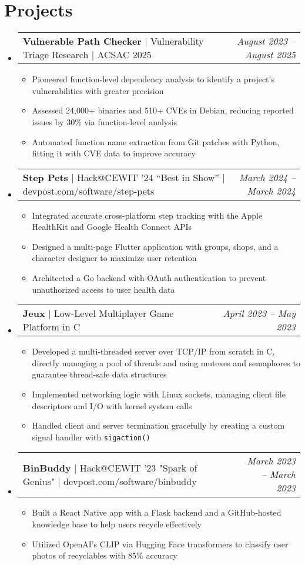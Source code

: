 \documentclass[letterpaper,11pt]{article}
\makeatletter
\newcommand{\resumeItem}[1]{
  \item\small{
    {#1 \vspace{-2pt}}
  }
}
\newcommand{\resumeProjectHeading}[2]{
    \item
    \begin{tabular*}{0.97\textwidth}{l@{\extracolsep{\fill}}r}
      \small#1 & \textit{\small #2} \\
    \end{tabular*}\vspace{-7pt}
}
\newcommand{\resumeSubHeadingListStart}{\begin{itemize}[leftmargin=0.15in, label={}]}
\newcommand{\resumeSubHeadingListEnd}{\end{itemize}}
\newcommand{\resumeItemListStart}{\begin{itemize}}
\newcommand{\resumeItemListEnd}{\end{itemize}\vspace{-5pt}}
\makeatother
\begin{document}
\section{Projects}
    \resumeSubHeadingListStart
        \resumeProjectHeading
        {\textbf{Vulnerable Path Checker} $|$ Vulnerability Triage Research $|$ ACSAC 2025}{August 2023 -- August 2025}
        \resumeItemListStart
            \resumeItem{Pioneered function-level dependency analysis to identify a project's vulnerabilities with greater precision}
            \resumeItem{Assessed 24,000+ binaries and 510+ CVEs in Debian, reducing reported issues by 30\% via function-level analysis}
            \resumeItem{Automated function name extraction from Git patches with Python, fitting it with CVE data to improve accuracy}
        \resumeItemListEnd

        \resumeProjectHeading
        {\textbf{Step Pets} $|$ Hack@CEWIT '24 “Best in Show” $|$ devpost.com/software/step-pets}{March 2024 -- March 2024}
        \resumeItemListStart
            \resumeItem{Integrated accurate cross-platform step tracking with the Apple HealthKit and Google Health Connect APIs}
            \resumeItem{Designed a multi-page Flutter application with groups, shops, and a character designer to maximize user retention}
            \resumeItem{Architected a Go backend with OAuth authentication to prevent unauthorized access to user health data}
        \resumeItemListEnd

        \resumeProjectHeading
        {\textbf{Jeux} $|$ Low-Level Multiplayer Game Platform in C}{April 2023 -- May 2023}
        \resumeItemListStart
            \resumeItem{Developed a multi-threaded server over TCP/IP from scratch in C, directly managing a pool of threads and using mutexes and semaphores to guarantee thread-safe data structures}
            \resumeItem{Implemented networking logic with Linux sockets, managing client file descriptors and I/O with kernel system calls}
            \resumeItem{Handled client and server termination gracefully by creating a custom signal handler with \texttt{sigaction()}}
        \resumeItemListEnd

        \resumeProjectHeading
        {\textbf{BinBuddy} $|$ Hack@CEWIT '23 "Spark of Genius" $|$ devpost.com/software/binbuddy}{March 2023 -- March 2023}
        \resumeItemListStart
            \resumeItem{Built a React Native app with a Flask backend and a GitHub-hosted knowledge base to help users recycle effectively}
            \resumeItem{Utilized OpenAI's CLIP via Hugging Face transformers to classify user photos of recyclables with 85\% accuracy}
        \resumeItemListEnd
    \resumeSubHeadingListEnd
\end{document}
